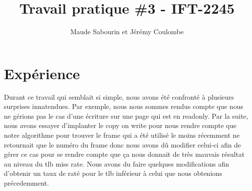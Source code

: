 \documentclass{article}
\title{Travail pratique \#3 - IFT-2245}
\author{Maude Sabourin et Jérémy Coulombe}
\begin{document}
\maketitle

\section{Expérience}
Durant ce travail qui semblait si simple, nous avons été confronté à plusieurs surprises innatendues. Par exemple, nous nous sommes rendus compte que nous ne gérions pas le cas d'une écriture sur une page qui est en readonly. Par la suite, nous avons essayer d'implanter le copy on write pour nous rendre compte que notre algorithme pour trouver le frame qui a été utilisé le moins récemment ne retournait que le numéro du frame donc nous avons dû modifier celui-ci afin de gérer ce cas pour se rendre compte que ça nous donnait de très mauvais résultat au niveau du tlb miss rate. Nous avons du faire quelques modifications afin d'obtenir un taux de raté pour le tlb inférieur à celui que nous obtenions précedemment.
\end{document}
